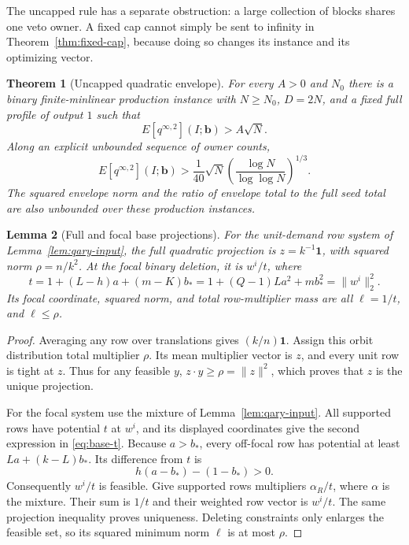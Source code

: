 \documentclass[11pt]{article}
\newtheorem{theorem}{Theorem}[section]
\newtheorem{lemma}[theorem]{Lemma}
\theoremstyle{definition}
\theoremstyle{remark}
\begin{document}
The uncapped rule has a separate obstruction: a large collection of
blocks shares one veto owner.  A fixed cap cannot simply be sent to
infinity in Theorem~\ref{thm:fixed-cap}, because doing so changes its
instance and its optimizing vector.

\begin{theorem}[Uncapped quadratic envelope]
\label{thm:uncapped}
For every $A>0$ and $N_0$ there is a binary finite-minlinear production
instance with $N\ge N_0$, $D=2N$, and a fixed full profile of output $1$
such that
\[
 E[q^{\infty,2}](I;\mathbf b)>A\sqrt N.
\]
Along an explicit unbounded sequence of owner counts,
\begin{equation}
 E[q^{\infty,2}](I;\mathbf b)>
 \frac1{40}\sqrt N\left(\frac{\log N}{\log\log N}\right)^{1/3}.
 \label{eq:uncapped-rate}
\end{equation}
The squared envelope norm and the ratio of envelope total to the full
seed total are also unbounded over these production instances.
\end{theorem}

\begin{lemma}[Full and focal base projections]
\label{lem:base-projections}
For the unit-demand row system of Lemma~\ref{lem:qary-input}, the full
quadratic projection is $z=k^{-1}\mathbf1$, with squared norm
$\rho=n/k^2$.  At the focal binary deletion, it is $w^i/t$, where
\begin{equation}
 t=1+(L-h)a+(m-K)b_*
  =1+(Q-1)L a^2+m b_*^2=\|w^i\|_2^2.
 \label{eq:base-t}
\end{equation}
Its focal coordinate, squared norm, and total row-multiplier mass are
all $\ell=1/t$, and $\ell\le\rho$.
\end{lemma}
\begin{proof}
Averaging any row over translations gives $(k/n)\mathbf1$.  Assign this
orbit distribution total multiplier $\rho$.  Its mean multiplier vector
is $z$, and every unit row is tight at $z$.  Thus for any feasible $y$,
$z\cdot y\ge\rho=\|z\|^2$, which proves that $z$ is the unique projection.

For the focal system use the mixture of Lemma~\ref{lem:qary-input}.
All supported rows have potential $t$ at $w^i$, and its displayed
coordinates give the second expression in \eqref{eq:base-t}.  Because
$a>b_*$, every off-focal row has potential at least
$La+(k-L)b_*$.  Its difference from $t$ is
\[
 h(a-b_*)-(1-b_*)>0.
\]
Consequently $w^i/t$ is feasible.  Give supported rows multipliers
$\alpha_R/t$, where $\alpha$ is the mixture.  Their sum is $1/t$ and
their weighted row vector is $w^i/t$.  The same projection inequality
proves uniqueness.  Deleting constraints only enlarges the feasible
set, so its squared minimum norm $\ell$ is at most $\rho$.
\end{proof}
\end{document}
